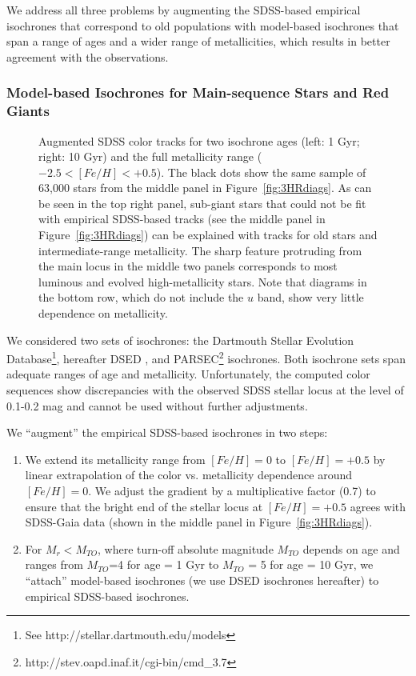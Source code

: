 We address all three problems by augmenting the SDSS-based empirical isochrones that correspond to old
populations with model-based isochrones that span a range of ages and a wider range of metallicities, which
results in better agreement with the observations. 
 

\subsubsection{Model-based Isochrones for Main-sequence Stars and Red Giants}
 

\begin{figure}[ht!]
\caption{Augmented SDSS color tracks for two isochrone ages (left: 1 Gyr; right: 10 Gyr) and the full metallicity range
  ($-2.5 < [Fe/H] < +0.5$). The black dots show the same sample of 63,000 stars from the middle panel in
  Figure~\ref{fig:3HRdiags}. As can be seen in the top right panel, sub-giant stars that could not be fit with empirical
  SDSS-based tracks (see the middle panel in Figure~\ref{fig:3HRdiags}) can be explained with tracks for old stars and
  intermediate-range metallicity. The sharp feature protruding from the main locus in the middle two panels corresponds
  to most luminous and evolved high-metallicity stars. Note that diagrams in the bottom row, which do not include
  the $u$ band, show very little dependence on metallicity.}  
\label{fig:augmLocus}
\end{figure}


We considered two sets of isochrones: the Dartmouth Stellar Evolution Database\footnote{See http://stellar.dartmouth.edu/models},
hereafter DSED \citep{2008ApJS..178...89D}, and PARSEC\footnote{http://stev.oapd.inaf.it/cgi-bin/cmd\_3.7} \citep{2012MNRAS.427..127B} isochrones. 
Both isochrone sets span adequate ranges of age and metallicity. Unfortunately, the computed color sequences show discrepancies
with the observed SDSS stellar locus at the level of 0.1-0.2 mag and cannot be used without further adjustments.

We ``augment'' the empirical SDSS-based isochrones in two steps:
\begin{enumerate}
\item We extend its metallicity range from $[Fe/H]=0$ to $[Fe/H]=+0.5$ by linear extrapolation of the color vs. metallicity
  dependence around $[Fe/H]=0$. We adjust the gradient by a multiplicative factor (0.7) to ensure that the bright end of the
  stellar locus at $[Fe/H]=+0.5$ agrees with SDSS-Gaia data (shown in the middle panel in Figure~\ref{fig:3HRdiags}).
\item 
  For $M_r < M_{TO}$, where turn-off absolute magnitude $M_{TO}$ depends on age and ranges from $M_{TO}$=4 for age = 1 Gyr
  to $M_{TO}$ = 5 for age = 10 Gyr, we ``attach'' model-based isochrones (we use DSED isochrones hereafter) to empirical
  SDSS-based isochrones.
\end{enumerate}


